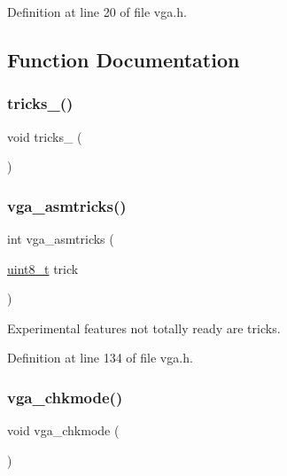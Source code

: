 Definition at line 20 of file vga.\+h.



\subsection{Function Documentation}
\mbox{\label{a00008_ada7cac23e36d1c5dbac6cbce14819f13_ada7cac23e36d1c5dbac6cbce14819f13}} 
\subsubsection{\texorpdfstring{tricks\+\_()}{tricks\_001()}}
{\footnotesize\ttfamily void tricks\+\_ (\begin{DoxyParamCaption}{ }\end{DoxyParamCaption})}

\mbox{\label{a00008_ab02c5c9bbc1e5c29dbb8898aee387eb2_ab02c5c9bbc1e5c29dbb8898aee387eb2}} 
\subsubsection{\texorpdfstring{vga\+\_\+asmtricks()}{vga\_asmtricks()}}
{\footnotesize\ttfamily int vga\+\_\+asmtricks (\begin{DoxyParamCaption}\item[{\hyperlink{a00038_aba7bc1797add20fe3efdf37ced1182c5_aba7bc1797add20fe3efdf37ced1182c5}{uint8\+\_\+t}}]{trick }\end{DoxyParamCaption})}



Experimental features not totally ready are tricks. 



Definition at line 134 of file vga.\+h.

\mbox{\label{a00008_aa156f6e955d649347fb0cf26bef28c1d_aa156f6e955d649347fb0cf26bef28c1d}} 
\subsubsection{\texorpdfstring{vga\+\_\+chkmode()}{vga\_chkmode()}}
{\footnotesize\ttfamily void vga\+\_\+chkmode (\begin{DoxyParamCaption}{ }\end{DoxyParamCaption})}



